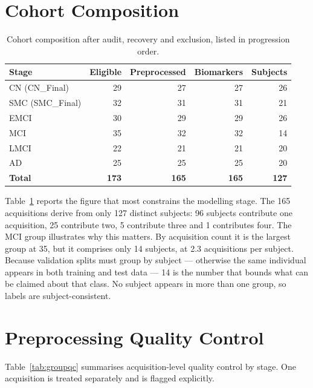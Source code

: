 \documentclass{ssnreview}
\begin{document}
\section{Cohort Composition}

\begin{table}[!htbp]
\centering
\caption[Cohort composition by stage]{Cohort composition after audit, recovery and exclusion, listed in
progression order.}
\label{tab:cohort}
\small
\begin{tabular}{lrrrr}
\toprule
\textbf{Stage} & \textbf{Eligible} & \textbf{Preprocessed} & \textbf{Biomarkers} &
\textbf{Subjects} \\
\midrule
CN (CN\_Final)   & 29 & 27 & 27 & 26 \\
SMC (SMC\_Final) & 32 & 31 & 31 & 21 \\
EMCI      & 30 & 29 & 29 & 26 \\
MCI       & 35 & 32 & 32 & 14 \\
LMCI      & 22 & 21 & 21 & 20 \\
AD        & 25 & 25 & 25 & 20 \\
\midrule
\textbf{Total} & \textbf{173} & \textbf{165} & \textbf{165} & \textbf{127} \\
\bottomrule
\end{tabular}
\end{table}

Table~\ref{tab:cohort} reports the figure that most constrains the modelling stage.
The 165 acquisitions derive from only 127 distinct subjects: 96 subjects contribute
one acquisition, 25 contribute two, 5 contribute three and 1 contributes four. The
MCI group illustrates why this matters. By acquisition count it is the largest group
at 35, but it comprises only 14 subjects, at 2.3 acquisitions per subject. Because
validation splits must group by subject --- otherwise the same individual appears in
both training and test data --- 14 is the number that bounds what can be claimed
about that class. No subject appears in more than one group, so labels are
subject-consistent.

\section{Preprocessing Quality Control}\label{sec:qc}

Table~\ref{tab:groupqc} summarises acquisition-level quality control by stage. One
acquisition is treated separately and is flagged explicitly.
\end{document}
